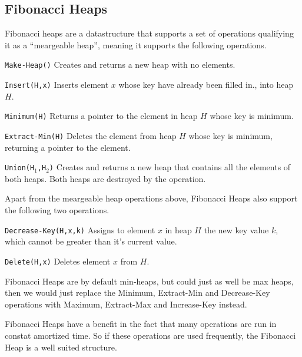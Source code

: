 \subsection{Fibonacci Heaps}
 Fibonacci heaps are a
datastructure that supports a set of operations qualifying it as a ``meargeable
heap'', meaning it supports the following operations.

\begin{itemize*}
  \item \texttt{Make-Heap()} Creates and returns a new heap with no elements.
  \item \texttt{Insert(H,x)} Inserts element $x$ whose key have already been
    filled in., into heap $H$.
  \item \texttt{Minimum(H)} Returns a pointer to the element in heap $H$ whose
    key is minimum.
  \item \texttt{Extract-Min(H)} Deletes the element from heap $H$ whose key is
    minimum, returning a pointer to the element.
  \item \texttt{Union(H$_1$,H$_2$)} Creates and returns a new heap that contains
    all the elements of both heaps. Both heaps are destroyed by the operation.
\end{itemize*}

Apart from the meargeable heap operations above, Fibonacci Heaps also support
the following two operations.

\begin{itemize*}
\item \texttt{Decrease-Key(H,x,k)} Assigns to element $x$ in heap $H$ the new
  key value $k$, which cannot be greater than it's current value.
  \item \texttt{Delete(H,x)} Deletes element $x$ from $H$.
\end{itemize*}

Fibonacci Heaps are by default min-heaps, but could just as well be max heaps,
then we would just replace the Minimum, Extract-Min and Decrease-Key operations
with Maximum, Extract-Max and Increase-Key instead.

Fibonacci Heaps have a benefit in the fact that many operations are run in
constat amortized time. So if these operations are used frequently, the
Fibonacci Heap is a well suited structure.

